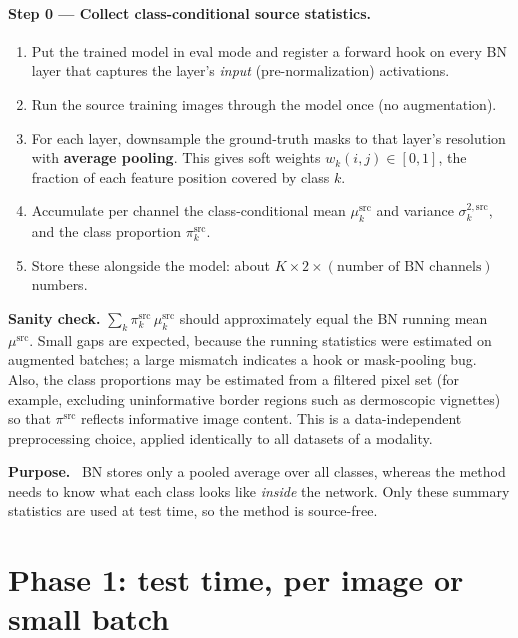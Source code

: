\documentclass[11pt,a4paper]{article}
\newcommand{\src}{\mathrm{src}}
\newenvironment{purpose}{\par\smallskip\noindent\textbf{Purpose.}\ }{\par\smallskip}
\begin{document}
\paragraph{Step 0 --- Collect class-conditional source statistics.}
\begin{enumerate}
\item Put the trained model in eval mode and register a forward hook on every BN layer that captures the layer's \emph{input} (pre-normalization) activations.
\item Run the source training images through the model once (no augmentation).
\item For each layer, downsample the ground-truth masks to that layer's resolution with \textbf{average pooling}. This gives soft weights $w_k(i,j)\in[0,1]$, the fraction of each feature position covered by class $k$.
\item Accumulate per channel the class-conditional mean $\mu^{\src}_k$ and variance $\sigma^{2,\src}_k$, and the class proportion $\pi^{\src}_k$.
\item Store these alongside the model: about $K\times 2\times(\text{number of BN channels})$ numbers.
\end{enumerate}

\noindent\textbf{Sanity check.} $\sum_k \pi^{\src}_k\,\mu^{\src}_k$ should approximately equal the BN running mean $\mu^{\src}$. Small gaps are expected, because the running statistics were estimated on augmented batches; a large mismatch indicates a hook or mask-pooling bug. Also, the class proportions may be estimated from a filtered pixel set (for example, excluding uninformative border regions such as dermoscopic vignettes) so that $\pi^{\src}$ reflects informative image content. This is a data-independent preprocessing choice, applied identically to all datasets of a modality.

\begin{purpose}
BN stores only a pooled average over all classes, whereas the method needs to know what each class looks like \emph{inside} the network. Only these summary statistics are used at test time, so the method is source-free.
\end{purpose}

\section{Phase 1: test time, per image or small batch}
\end{document}
